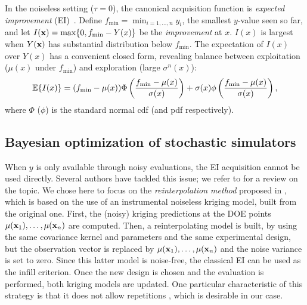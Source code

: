 In the noiseless setting ($\tau=0$), the canonical acquisition function is {\em expected improvement} (EI)~\cite{jones1998efficient}. 
Define $f_{\min} = \min_{i=1,\ldots,n} y_i$, the smallest $y$-value seen so
far, and let $I(\mathbf{x}) = \max\{ 0, f_{\min} - Y(x) \}$
be the {\em improvement} at $x$.  $I(x)$ is largest when $Y(\mathbf{x})$ has
substantial distribution below $f_{\min}$. 
The expectation of $I(x)$ over $Y(x)$ has a convenient closed form,
revealing balance between exploitation ($\mu(x)$ under $f_{\min}$) and
exploration (large $\sigma^{n}(x)$):
\begin{equation}
\mathbb{E} \{I(x)\} = (f_{\min} - \mu(x)) \Phi\left(
\frac{f_{\min} - \mu(x)}{\sigma(x)}\right)
+ \sigma(x) \phi\left(
\frac{f_{\min} - \mu(x)}{\sigma(x)}\right),
\label{eq:ei}
\end{equation}
where $\Phi$ ($\phi$) is the standard normal cdf (and pdf respectively). \\

\subsection{Bayesian optimization of stochastic simulators}
When $y$ is only available through noisy evaluations, the EI acquisition cannot be used directly.
Several authors have tackled this issue; we refer to \cite{picheny2013benchmark} for a review on the topic.
We chose here to focus on the \textit{reinterpolation method} proposed in \cite{forrester2006design}, which is based on the use of an instrumental noiseless kriging model, 
built from the original one. First, the (noisy) kriging predictions at the DOE points $\mu(\mathbf{x}_1), \ldots, \mu(\mathbf{x}_n)$ are computed. 
Then, a reinterpolating model is built, by using the same covariance kernel and parameters and the same experimental design, but
the observation vector is replaced by $\mu(\mathbf{x}_1), \ldots, \mu(\mathbf{x}_n)$ and the noise variance is set to zero. Since this latter model is
noise-free, the classical EI can be used as the infill criterion. Once the new design is chosen and the evaluation is performed,
both kriging models are updated. One particular characteristic of this strategy is that it does not allow repetitions  , which is desirable in our
case.

